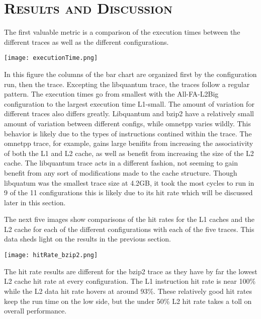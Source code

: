 \documentclass[cacheSimReport.tex]{subfiles}
\begin{document}
\section*{\textsc{\Large Results and Discussion}}

The first valuable metric is a comparison of the execution times between the different traces as well as the different configurations.

\smallskip

\hspace{-.9cm}\texttt{[image: executionTime.png]}

\pagebreak

In this figure the columns of the bar chart are organized first by the configuration run, then the trace. Excepting the libquantum trace, the traces follow a regular pattern. The execution times go from smallest with the All-FA-L2Big configuration to the largest execution time L1-small. The amount of variation for different traces also differs greatly. Libquantum and bzip2 have a relatively small amount of variation between different configs, while omnetpp varies wildly. This behavior is likely due to the types of instructions contined within the trace. The omnetpp trace, for example, gains large benifits from increasing the associativity of both the L1 and L2 cache, as well as benefit from increasing the size of the L2 cache. The libquantum trace acts in a different fashion, not seeming to gain benefit from any sort of modifications made to the cache structure. Though libquatum was the smallest trace size at 4.2GB, it took the most cycles to run in 9 of the 11 configurations this is likely due to its hit rate which will be discussed later in this section.

\smallskip

The next five images show comparisons of the hit rates for the L1 caches and the L2 cache for each of the different configurations with each of the five traces. This data sheds light on the results in the previous section.

\hspace{-.9cm}\texttt{[image: hitRate\_bzip2.png]}

The hit rate results are different for the bzip2 trace as they have by far the lowest L2 cache hit rate at every configuration. The L1 instruction hit rate is near 100\% while the L2 data hit rate hovers at around 93\%. These relatively good hit rates keep the run time on the low side, but the under 50\% L2 hit rate takes a toll on overall performance.
\end{document}
